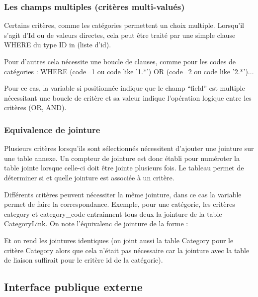 \subsubsection{Les champs multiples (critères multi-valués)}

Certains critères, comme les catégories permettent un choix multiple.
Lorsqu'il s'agit d'Id ou de valeurs directes, cela peut être traité par une simple clause WHERE du type ID in (liste d'id).

Pour d'autres cela nécessite une boucle de clauses, comme pour les codes de catégories :
WHERE (code=1 ou code like '1.*') OR (code=2 ou code like '2.*')...

Pour ce cas, la variable  si positionnée indique que le champ ``field'' est multiple nécessitant une boucle de critère et sa valeur indique l'opération logique entre les critères (OR, AND).

\subsubsection{Equivalence de jointure}

Plusieurs critères lorsqu'ils sont sélectionnés nécessitent d'ajouter une jointure sur une table annexe. Un compteur de jointure est donc établi pour numéroter la table jointe lorsque celle-ci doit être jointe plusieurs fois.
Le tableau  permet de déterminer si et quelle jointure est associée à un critère.

Différents critères peuvent nécessiter la même jointure, dans ce cas la variable  permet de faire la correspondance.
Exemple, pour une catégorie, les critères category et category\_code entrainnent tous deux la jointure de la table CategoryLink.
On note l'équivalenc de jointure de la forme :\\


Et on rend les jointures identiques (on joint aussi la table Category pour le critère Category alors que cela n'était pas nécessaire car la jointure avec la table de liaison suffirait pour le critère id de la catégorie).


\subsection{Interface publique externe}

